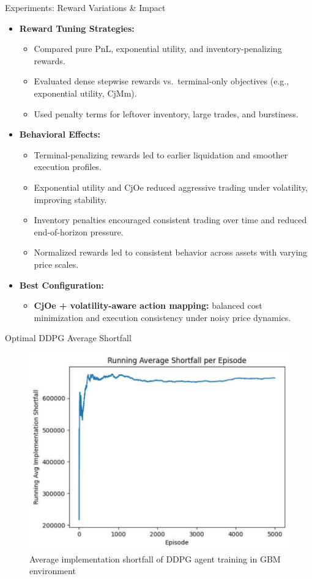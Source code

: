 \documentclass[11pt,aspectratio=169]{beamer}   %
\begin{document}
\begin{frame}{Experiments: Reward Variations \& Impact}
	\begin{itemize}
		\item \textbf{Reward Tuning Strategies:}
		\begin{itemize}
			\item Compared pure PnL, exponential utility, and inventory-penalizing rewards.
			\item Evaluated dense stepwise rewards vs.\ terminal-only objectives (e.g., exponential utility, CjMm).
			\item Used penalty terms for leftover inventory, large trades, and burstiness.
		\end{itemize}
		
		\item \textbf{Behavioral Effects:}
		\begin{itemize}
			\item Terminal-penalizing rewards led to earlier liquidation and smoother execution profiles.
			\item Exponential utility and CjOe reduced aggressive trading under volatility, improving stability.
			\item Inventory penalties encouraged consistent trading over time and reduced end-of-horizon pressure.
			\item Normalized rewards led to consistent behavior across assets with varying price scales.
		\end{itemize}
		
		\item \textbf{Best Configuration:}
		\begin{itemize}
			\item \textbf{CjOe + volatility-aware action mapping:} balanced cost minimization and execution consistency under noisy price dynamics.
		\end{itemize}
	\end{itemize}
\end{frame}

\begin{frame}{Optimal DDPG Average Shortfall}
	\begin{figure}[ht]
		\centering
		\includegraphics[width=0.55\linewidth]{DDPG_Implementation_SF_GBM.pdf}
		\caption{Average implementation shortfall of DDPG agent training in GBM environment }
	\end{figure}
\end{frame}
\end{document}
